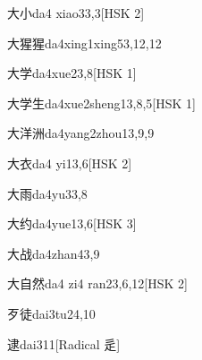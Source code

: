 \begin{entry}{大小}{da4 xiao3}{3,3}[HSK 2]
\end{entry}

\begin{entry}{大猩猩}{da4xing1xing5}{3,12,12}
\end{entry}

\begin{entry}{大学}{da4xue2}{3,8}[HSK 1]
\end{entry}

\begin{entry}{大学生}{da4xue2sheng1}{3,8,5}[HSK 1]
\end{entry}

\begin{entry}{大洋洲}{da4yang2zhou1}{3,9,9}
\end{entry}

\begin{entry}{大衣}{da4 yi1}{3,6}[HSK 2]
\end{entry}

\begin{entry}{大雨}{da4yu3}{3,8}
\end{entry}

\begin{entry}{大约}{da4yue1}{3,6}[HSK 3]
\end{entry}

\begin{entry}{大战}{da4zhan4}{3,9}
\end{entry}

\begin{entry}{大自然}{da4 zi4 ran2}{3,6,12}[HSK 2]
\end{entry}

\begin{entry}{歹徒}{dai3tu2}{4,10}
\end{entry}

\begin{entry}{逮}{dai3}{11}[Radical 辵]
\end{entry}

